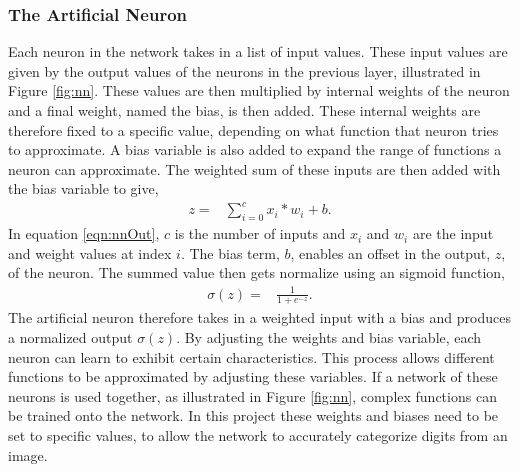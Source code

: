 \subsubsection{The Artificial Neuron}
Each neuron in the network takes in a list of input values. These input values are given by the output values of the neurons in the previous layer, illustrated in Figure \ref{fig:nn}. These values are then multiplied by internal weights of the neuron and a final weight, named the bias, is then added. These internal weights are therefore fixed to a specific value, depending on what function that neuron tries to approximate. A bias variable is also added to expand the range of functions a neuron can approximate. The weighted sum of these inputs are then added with the bias variable to give,
\begin{align}
  z =  &\displaystyle{\sum_{i=0}^{c} x_{i}*w_{i} + b}.
\label{eqn:nnOut}
\end{align}
In equation \ref{eqn:nnOut}, $c$ is the number of inputs and $x_{i}$ and $w_{i}$ are the input and weight values at index $i$. The bias term, $b$, enables an offset in the output, $z$, of the neuron.
The summed value then gets normalize using an sigmoid function,
\begin{align}
  \sigma(z) =  &\displaystyle{\frac{1}{1 + e^{-z}}}.
\label{eqn:sigmoid}
\end{align}
The artificial neuron therefore takes in a weighted input with a bias and produces a normalized output $\sigma(z)$. By adjusting the weights and bias variable, each neuron can learn to exhibit certain characteristics. This process allows different functions to be approximated by adjusting these variables. If a network of these neurons is used together, as illustrated in Figure \ref{fig:nn}, complex functions can be trained onto the network. In this project these weights and biases need to be set to specific values, to allow the network to accurately categorize digits from an image.

